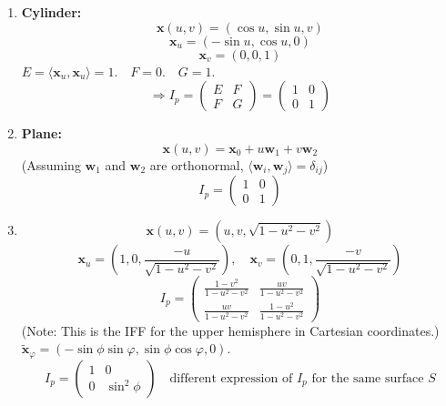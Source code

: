 \documentclass{article}
\begin{document}
\begin{example}
\begin{enumerate}
    \item \textbf{Cylinder:}
    \[
    \mathbf{x}(u, v) = (\cos u, \sin u, v)
    \]
    \[
    \mathbf{x}_u = (-\sin u, \cos u, 0)
    \]
    \[
    \mathbf{x}_v = (0, 0, 1)
    \]
    $E = \langle \mathbf{x}_u, \mathbf{x}_u \rangle = 1. \quad F = 0. \quad G = 1.$
    \[
    \Rightarrow I_p = \begin{pmatrix} E & F \\ F & G \end{pmatrix} = \begin{pmatrix} 1 & 0 \\ 0 & 1 \end{pmatrix}
    \]

    \item \textbf{Plane:}
    \[
    \mathbf{x}(u, v) = \mathbf{x}_0 + u \mathbf{w}_1 + v \mathbf{w}_2
    \]
    (Assuming $\mathbf{w}_1$ and $\mathbf{w}_2$ are orthonormal, $\langle \mathbf{w}_i, \mathbf{w}_j \rangle = \delta_{ij}$)
    \[
    I_p = \begin{pmatrix} 1 & 0 \\ 0 & 1 \end{pmatrix}
    \]

    \item
    \[
    \mathbf{x}(u, v) = (u, v, \sqrt{1-u^2-v^2})
    \]
    \[
    \mathbf{x}_u = \left( 1, 0, \frac{-u}{\sqrt{1-u^2-v^2}} \right), \quad \mathbf{x}_v = \left( 0, 1, \frac{-v}{\sqrt{1-u^2-v^2}} \right)
    \]
    \[
    I_p = \begin{pmatrix}
        \frac{1-v^2}{1-u^2-v^2} & \frac{uv}{1-u^2-v^2} \\
        \frac{uv}{1-u^2-v^2} & \frac{1-u^2}{1-u^2-v^2}
    \end{pmatrix}
    \]
    (Note: This is the IFF for the upper hemisphere in Cartesian coordinates.)
    $\mathbf{\tilde{x}}_\varphi = (-\sin \phi \sin \varphi, \sin \phi \cos \varphi, 0)$.
\[
I_p = \begin{pmatrix} 1 & 0 \\ 0 & \sin^2 \phi \end{pmatrix} \quad \text{different expression of } I_p \text{ for the same surface } S
\]
\end{enumerate}
\end{example}
\end{document}
